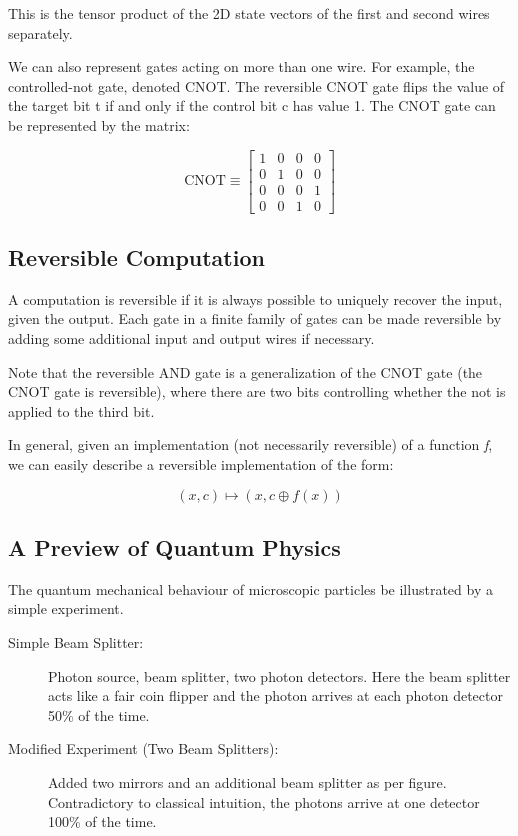 \documentclass[12pt]{article}
\begin{document}
This is the tensor product of the 2D state vectors of the first and second wires separately.

We can also represent gates acting on more than one wire. For example, the controlled-not gate, denoted CNOT. The reversible CNOT gate flips the value of the target bit t if and only if the control bit c has value 1. The CNOT gate can be represented by the matrix:

\begin{equation}
    \text{CNOT} \equiv 
    \begin{bmatrix}
        1 & 0 & 0 & 0 \\
        0 & 1 & 0 & 0 \\
        0 & 0 & 0 & 1 \\
        0 & 0 & 1 & 0
    \end{bmatrix}
\end{equation}

\subsection{Reversible Computation}

\hspace*{0.5cm} A computation is reversible if it is always possible to uniquely recover the input, given the output. Each gate in a finite family of gates can be made reversible by adding some additional input and output wires if necessary.

Note that the reversible AND gate is a generalization of the CNOT gate (the CNOT gate is reversible), where there are two bits controlling whether the not is applied to the third bit.

In general, given an implementation (not necessarily reversible) of a function \textit{f}, we can easily describe a reversible implementation of the form:

\begin{equation}
    (x, c) \mapsto (x, c \oplus f(x))
\end{equation}

\subsection{A Preview of Quantum Physics}

The quantum mechanical behaviour of microscopic particles be illustrated by a simple experiment.
\begin{description}
    \item[Simple Beam Splitter:]  Photon source, beam splitter, two photon detectors. Here the beam splitter acts like a fair coin flipper and the photon arrives at each photon detector 50\% of the time.
    \item[Modified Experiment (Two Beam Splitters):] Added two mirrors and an additional beam splitter as per figure. Contradictory to classical intuition, the photons arrive at one detector 100\% of the time.
\end{description}
\end{document}
